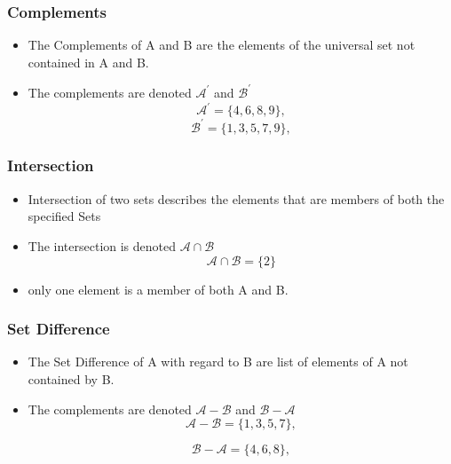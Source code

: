 
\subsubsection*{Complements}
\begin{itemize}

\item The Complements of A and B are the elements of the universal set not contained in A and B.

\item The complements are denoted $\mathcal{A}^{\prime}$ and $\mathcal{B}^{\prime}$
\[ \mathcal{A}^{\prime} = \{4,6,8,9\}, \]
\[ \mathcal{B}^{\prime} = \{1,3,5,7,9\}, \]

\end{itemize}



\subsubsection*{Intersection}
\begin{itemize}

\item Intersection of two sets describes the elements that are members of both the specified Sets

\item The intersection is denoted $\mathcal{A\cap B}$ 
\[ \mathcal{A\cap B} = \{2\}\]

\item only one element is a member of both A and B.
\end{itemize}

\subsubsection*{Set Difference}
\begin{itemize}

\item The Set Difference of A with regard to B are list of elements of A not contained by B.

\item The complements are denoted $\mathcal{A-B}$ and $\mathcal{B-A}$
\[ \mathcal{A-B} = \{1,3,5,7\}, \]

\[ \mathcal{B-A} = \{4,6,8\}, \]
\end{itemize}

